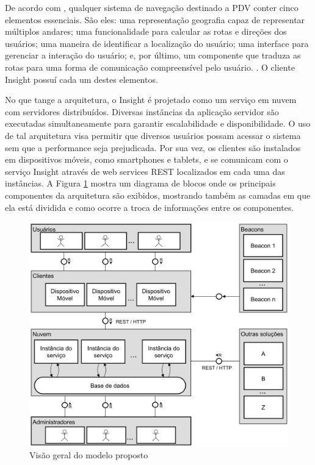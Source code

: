 \documentclass[twoside,english,brazilian]{UNISINOSartigo}
\begin{document}
De acordo com , qualquer sistema de navegação destinado a PDV conter cinco elementos essenciais. São eles: uma representação geografia capaz de representar múltiplos andares; uma funcionalidade para calcular as rotas e direções dos usuários; uma maneira de identificar a localização do usuário; uma interface para gerenciar a interação do usuário; e, por último, um componente que traduza as rotas para uma forma de comunicação compreensível pelo usuário. \cite{gedawy2011designing}. O cliente Insight possuí cada um destes elementos.

No que tange a arquitetura, o Insight é projetado como um serviço em nuvem com servidores distribuídos. Diversas instâncias da aplicação servidor são executadas simultaneamente para garantir escalabilidade e disponibilidade. O uso de tal arquitetura visa permitir que diversos usuários possam acessar o sistema sem que a performance seja prejudicada. Por sua vez, os clientes são instalados em dispositivos móveis, como smartphones e tablets, e se comunicam com o serviço Insight através de web services REST localizados em cada uma das instâncias. A Figura \ref{fig:arquitetura} mostra um diagrama de blocos onde os principais componentes da arquitetura são exibidos, mostrando também as camadas em que ela está dividida e como ocorre a troca de informações entre os componentes. 

\begin{figure}[!ht]
	\caption{Visão geral do modelo proposto}
	\label{fig:arquitetura}
	\centering%
	\begin{minipage}{.8\textwidth}
		\includegraphics[width=\textwidth]{imgs/arquitetura.png}
	\end{minipage}
\end{figure}
\end{document}
